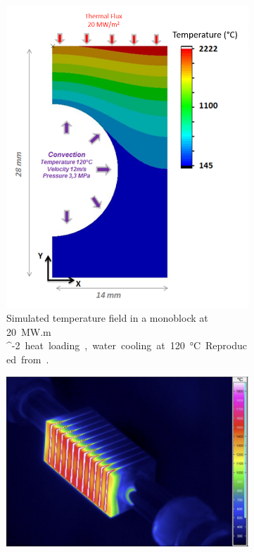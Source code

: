 \begin{figure} [h]
    \centering
    \begin{subfigure}[t]{0.45\linewidth}
            \includegraphics[width=\linewidth]{Figures/Chapter1/alan_durif_monoblock.png}
            \caption{Simulated temperature field in a monoblock at \SI{20}{MW.m ^{-2}} heat loading, water cooling at \SI{120}{\celsius}. Reproduced from \cite{durif_modelisation_2019}.}
    \end{subfigure}\hfill%
    \begin{subfigure}[t]{0.45\linewidth}
            \includegraphics[width=\linewidth]{Figures/Chapter1/monoblock_experimental_temperature_field.png}

\end{subfigure}
\end{figure}
